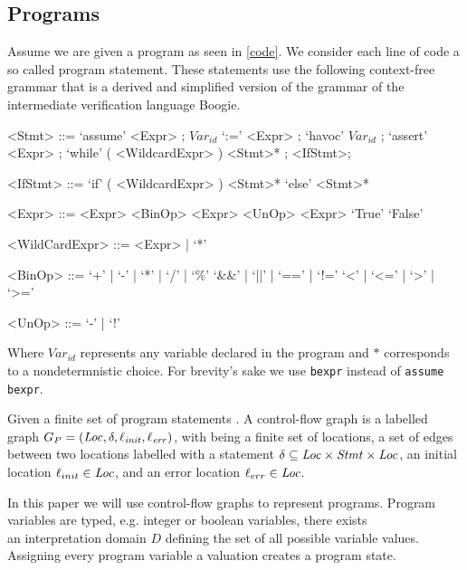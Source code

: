 \subsection{Programs}
Assume we are given a program as seen in \ref{code}. We consider each line of code a so called program statement. These statements use the following context-free grammar that is a derived and simplified version of the grammar of the intermediate verification language Boogie\cite{Boogie}.
\setlength{\grammarparsep}{20pt plus 1pt minus 1pt} %
\setlength{\grammarindent}{12em} %
\begin{grammar}
	<Stmt> ::= `assume' <Expr> ;
	\alt $Var_{id}$ `:=' <Expr> ;
	\alt `havoc' $Var_{id}$ ;
	\alt `assert' <Expr> ;
	\alt `while' ( <WildcardExpr> ) <Stmt>* ;
	\alt <IfStmt>;
	
	<IfStmt> ::= `if' ( <WildcardExpr> ) <Stmt>* `else' <Stmt>*

	<Expr> ::= <Expr> <BinOp> <Expr>
	\alt <UnOp> <Expr>
	\alt `True'
	\alt `False'
		
	<WildCardExpr> ::= <Expr> | `*'
	
	<BinOp> ::= `+' | `-' | `*' | `/' | `\%'
	\alt `\&\&' | `||' | `==' | `!='
	\alt `<' | `<=' | `>' | `>='
	
	<UnOp> ::= `-' | `!'
\end{grammar}
Where $Var_{id}$ represents any variable declared in the program and $*$ corresponds to a nondetermnistic choice.
For brevity's sake we use \texttt{bexpr} instead of \texttt{assume bexpr}.

\begin{mydef}
	Given a finite set of program statements \stmt. A control-flow graph is a labelled graph $G_P = (\mathit{Loc}, \delta, \ell_{\mathit{init}}, \ell_{\mathit{err}})$, with
	\Loc being a finite set of locations,
	a set of edges between two locations labelled with a statement $\delta \subseteq \mathit{Loc} \times \mathit{Stmt} \times \mathit{Loc}$,
	an initial location $\ell_{init} \in \mathit{Loc}$, and
	an error location $\ell_{err} \in \mathit{Loc}$.
\end{mydef}
In this paper we will use control-flow graphs to represent programs.
Program variables are typed, e.g. integer or boolean variables, there exists \\
an interpretation domain $D$ defining the set of all possible variable values.
Assigning every program variable a valuation creates a program state.

